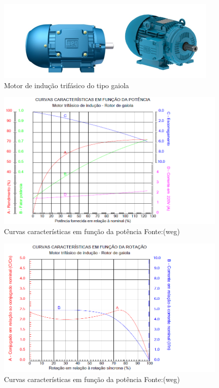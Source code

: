 \begin{figure}[!ht]
\centering
\includegraphics[scale=0.8]{figuras/motorgaiola.png}
\caption{Motor de indução trifásico do tipo gaiola}
\label{fig:motorgaiola}
\end{figure}

\begin{figure}[!ht]
\centering
\includegraphics[scale=0.8]{figuras/Motor_potencia.png}
\caption{Curvas características em função da potência Fonte:(weg)}
\label{fig:motor_potencia}
\end{figure}

\begin{figure}[!ht]
\centering
\includegraphics[scale=0.8]{figuras/motor_rota__o.png}
\caption{Curvas características em função da potência Fonte:(weg)}
\label{fig:motor_rota__o}
\end{figure}

